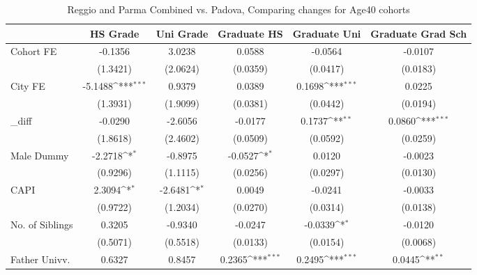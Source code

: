 \begin{table}[htbp]\centering
\def\sym#1{\ifmmode^{#1}\else\(^{#1}\)\fi}
\caption{Reggio and Parma Combined vs. Padova, Comparing changes for Age40 cohorts}
\begin{tabular}{l*{5}{c}}
\toprule
            &\multicolumn{1}{c}{HS Grade}&\multicolumn{1}{c}{Uni Grade}&\multicolumn{1}{c}{Graduate HS}&\multicolumn{1}{c}{Graduate Uni}&\multicolumn{1}{c}{Graduate Grad Sch}\\
\midrule
Cohort FE   &     -0.1356         &      3.0238         &      0.0588         &     -0.0564         &     -0.0107         \\
            &    (1.3421)         &    (2.0624)         &    (0.0359)         &    (0.0417)         &    (0.0183)         \\
\addlinespace
City FE     &     -5.1488\sym{***}&      0.9379         &      0.0389         &      0.1698\sym{***}&      0.0225         \\
            &    (1.3931)         &    (1.9099)         &    (0.0381)         &    (0.0442)         &    (0.0194)         \\
\addlinespace
\_diff       &     -0.0290         &     -2.6056         &     -0.0177         &      0.1737\sym{**} &      0.0860\sym{***}\\
            &    (1.8618)         &    (2.4602)         &    (0.0509)         &    (0.0592)         &    (0.0259)         \\
\addlinespace
Male Dummy  &     -2.2718\sym{*}  &     -0.8975         &     -0.0527\sym{*}  &      0.0120         &     -0.0023         \\
            &    (0.9296)         &    (1.1115)         &    (0.0256)         &    (0.0297)         &    (0.0130)         \\
\addlinespace
CAPI        &      2.3094\sym{*}  &     -2.6481\sym{*}  &      0.0049         &     -0.0241         &     -0.0033         \\
            &    (0.9722)         &    (1.2034)         &    (0.0270)         &    (0.0314)         &    (0.0138)         \\
\addlinespace
No. of Siblings&      0.3205         &     -0.9340         &     -0.0247         &     -0.0339\sym{*}  &     -0.0120         \\
            &    (0.5071)         &    (0.5518)         &    (0.0133)         &    (0.0154)         &    (0.0068)         \\
\addlinespace
Father Univv.&      0.6327         &      0.8457         &      0.2365\sym{***}&      0.2495\sym{***}&      0.0445\sym{**} \\

\end{tabular}
\end{table}
